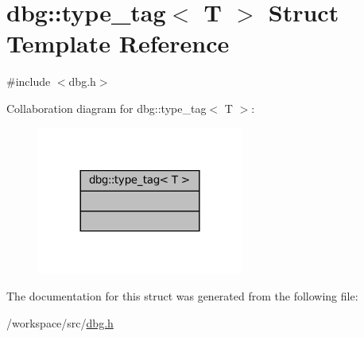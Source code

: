 \hypertarget{structdbg_1_1type__tag}{}\section{dbg\+:\+:type\+\_\+tag$<$ T $>$ Struct Template Reference}
\label{structdbg_1_1type__tag}


{\ttfamily \#include $<$dbg.\+h$>$}



Collaboration diagram for dbg\+:\+:type\+\_\+tag$<$ T $>$\+:
\nopagebreak
\begin{figure}[H]
\begin{center}
\leavevmode
\includegraphics[width=192pt]{structdbg_1_1type__tag__coll__graph}
\end{center}
\end{figure}


The documentation for this struct was generated from the following file\+:\begin{DoxyCompactItemize}
\item 
/workspace/src/\hyperlink{dbg_8h}{dbg.\+h}\end{DoxyCompactItemize}
